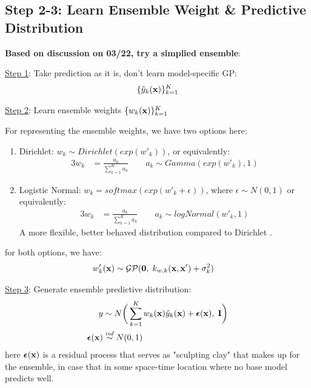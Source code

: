 \documentclass[11pt]{article}
\theoremstyle{definition}
\begin{document}
\clearpage
\subsection{\textbf{Step 2-3: Learn Ensemble Weight \& Predictive Distribution}}


\textbf{Based on discussion on 03/22, try a simplied ensemble}:

\underline{Step 1}: Take prediction as it is, don't learn model-specific GP:
\begin{alignat*}{3}
\{\hat{y}_k({\bf x})\}_{k=1}^K
\end{alignat*}

\underline{Step 2}: Learn ensemble weights $\{w_k({\bf x})\}_{k=1}^K$

For representing the ensemble weights, we have two options here:
\begin{enumerate}
\item Dirichlet: $w_k \sim Dirichlet(exp(w'_k))$, or equivalently:
\begin{alignat*}{3}
w_k &= \frac{a_k}{\sum_{k=1}^K a_k} \qquad 
a_k \sim Gamma(exp(w'_k), 1)
\end{alignat*}
\item Logistic Normal: $w_k = softmax(exp(w'_k + \epsilon))$, where $\epsilon \sim N(0, 1)$ or equivalently:
\begin{alignat*}{3}
w_k &= \frac{a_k}{\sum_{k=1}^K a_k} \qquad 
a_k \sim logNormal(w'_k, 1)
\end{alignat*}
A more flexible, better behaved distribution compared to Dirichlet \citep{aitchison_logistic-normal_1980}.
\end{enumerate}
for both options, we have:
\begin{alignat*}{3}
w'_k({\bf x}) & \sim {\cal G}{\cal P}({\bf 0}, \; k_{w,k}({\bf x}, {\bf x}') + \sigma_k^2 )
\end{alignat*}

\underline{Step 3}: Generate ensemble predictive distribution:
\begin{align*}
y &\sim N \bigg(
\sum_{k=1}^K w_k({\bf x}) \hat{y}_k({\bf x}) + \boldsymbol{\epsilon}({\bf x}), \; {\bf I} \bigg)\\
\boldsymbol{\epsilon}({\bf x}) &\stackrel{iid}{\sim} N(0, 1)
\end{align*}
here $\boldsymbol{\epsilon}({\bf x})$ is a residual process that serves as "sculpting clay" that makes up for the ensemble, in case that in some space-time location where no base model predicts well.
\end{document}
